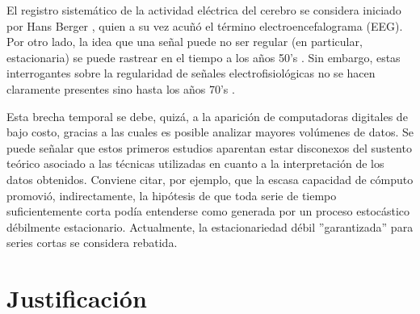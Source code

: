 \documentclass[12pt,a4paper]{mitthesis}
\begin{document}
El registro sistem\'atico de la actividad el\'ectrica del cerebro se considera iniciado por Hans 
Berger \cite{Berger29}, quien a su vez acu\~n\'o el t\'ermino electroencefalograma (EEG).
Por otro lado, la idea que una se\~nal puede no ser regular (en particular, estacionaria) se puede 
rastrear en el tiempo a los a\~nos 50’s \cite{Page52,Silverman57}. 
Sin embargo, estas interrogantes sobre la regularidad de se\~nales electrofisiol\'ogicas no se 
hacen claramente presentes sino hasta los a\~nos 70's \cite{Kawabata73,McEwen75,Cohen77,Sugimoto78}.

Esta brecha temporal se debe, quiz\'a, a la aparici\'on de computadoras digitales de bajo costo, 
gracias a las cuales es posible analizar mayores vol\'umenes de datos.
Se puede se\~nalar que estos primeros estudios aparentan estar disconexos del sustento te\'orico 
asociado a las t\'ecnicas  utilizadas en cuanto a la interpretaci\'on de los datos obtenidos. 
Conviene citar, por ejemplo, que la escasa capacidad de c\'omputo promovi\'o, indirectamente, la 
hip\'otesis de que {toda} serie de tiempo suficientemente corta pod\'ia entenderse como generada 
por un proceso estoc\'astico d\'ebilmente estacionario.
Actualmente, la estacionariedad d\'ebil ''garantizada'' para series cortas se considera rebatida\cite{Melard89,Adak98,Klonowski09}.



\section{Justificaci\'on}
\end{document}
